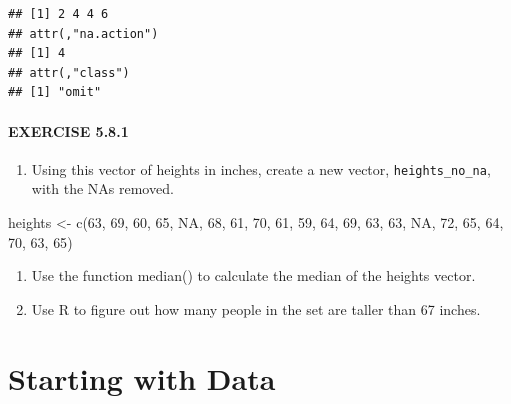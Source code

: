 \documentclass[
]{book}
\newenvironment{Shaded}{\begin{snugshade}}{\end{snugshade}}
\newcommand{\ConstantTok}[1]{\textcolor[rgb]{0.00,0.00,0.00}{#1}}
\newcommand{\DecValTok}[1]{\textcolor[rgb]{0.00,0.00,0.81}{#1}}
\newcommand{\FunctionTok}[1]{\textcolor[rgb]{0.00,0.00,0.00}{#1}}
\newcommand{\NormalTok}[1]{#1}
\newcommand{\OtherTok}[1]{\textcolor[rgb]{0.56,0.35,0.01}{#1}}
\providecommand{\tightlist}{%
  \setlength{\itemsep}{0pt}\setlength{\parskip}{0pt}}
\begin{document}
\begin{verbatim}
## [1] 2 4 4 6
## attr(,"na.action")
## [1] 4
## attr(,"class")
## [1] "omit"
\end{verbatim}

\hypertarget{exercise-5.8.1}{%
\subsubsection*{EXERCISE 5.8.1}\label{exercise-5.8.1}}

\begin{enumerate}
\def\labelenumi{\arabic{enumi}.}
\tightlist
\item
  Using this vector of heights in inches, create a new vector, \texttt{heights\_no\_na}, with the NAs removed.
\end{enumerate}

\begin{Shaded}
\begin{Highlighting}[]
\NormalTok{heights }\OtherTok{\textless{}{-}} \FunctionTok{c}\NormalTok{(}\DecValTok{63}\NormalTok{, }\DecValTok{69}\NormalTok{, }\DecValTok{60}\NormalTok{, }\DecValTok{65}\NormalTok{, }\ConstantTok{NA}\NormalTok{, }\DecValTok{68}\NormalTok{, }\DecValTok{61}\NormalTok{, }\DecValTok{70}\NormalTok{, }\DecValTok{61}\NormalTok{, }\DecValTok{59}\NormalTok{, }\DecValTok{64}\NormalTok{, }\DecValTok{69}\NormalTok{, }\DecValTok{63}\NormalTok{, }\DecValTok{63}\NormalTok{, }\ConstantTok{NA}\NormalTok{, }\DecValTok{72}\NormalTok{, }\DecValTok{65}\NormalTok{, }\DecValTok{64}\NormalTok{, }\DecValTok{70}\NormalTok{, }\DecValTok{63}\NormalTok{, }\DecValTok{65}\NormalTok{)}
\end{Highlighting}
\end{Shaded}

\begin{enumerate}
\def\labelenumi{\arabic{enumi}.}
\setcounter{enumi}{1}
\tightlist
\item
  Use the function median() to calculate the median of the heights vector.
\item
  Use R to figure out how many people in the set are taller than 67 inches.
\end{enumerate}

\hypertarget{starting-with-data}{%
\chapter{Starting with Data}\label{starting-with-data}}
\end{document}
